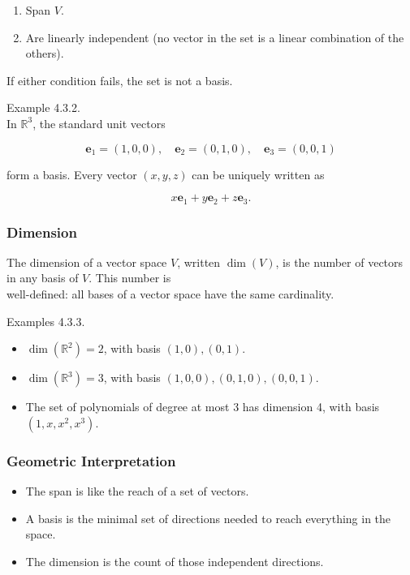 \documentclass[
  12pt,
  a4paper,
]{article}
\begin{document}
\begin{enumerate}
\def\labelenumi{\arabic{enumi}.}
\item
  Span \(V\).
\item
  Are linearly independent (no vector in the set is a linear combination
  of the others).
\end{enumerate}

If either condition fails, the set is not a basis.

Example 4.3.2.\\
In \(\mathbb{R}^3\), the standard unit vectors

\[\mathbf{e}_1 = (1,0,0), \quad \mathbf{e}_2 = (0,1,0), \quad \mathbf{e}_3 = (0,0,1)\]

form a basis. Every vector \((x,y,z)\) can be uniquely written as

\[x\mathbf{e}_1 + y\mathbf{e}_2 + z\mathbf{e}_3.\]

\subsubsection{Dimension}\label{dimension}

The dimension of a vector space \(V\), written \(\dim(V)\), is the
number of vectors in any basis of \(V\). This number is\\
well-defined: all bases of a vector space have the same cardinality.

Examples 4.3.3.

\begin{itemize}
\item
  \(\dim(\mathbb{R}^2) = 2\), with basis \((1,0), (0,1)\).
\item
  \(\dim(\mathbb{R}^3) = 3\), with basis \((1,0,0), (0,1,0), (0,0,1)\).
\item
  The set of polynomials of degree at most 3 has dimension 4, with basis
  \((1, x, x^2, x^3)\).
\end{itemize}

\subsubsection{Geometric
Interpretation}\label{geometric-interpretation-6}

\begin{itemize}
\item
  The span is like the reach of a set of vectors.
\item
  A basis is the minimal set of directions needed to reach everything in
  the space.
\item
  The dimension is the count of those independent directions.
\end{itemize}
\end{document}
